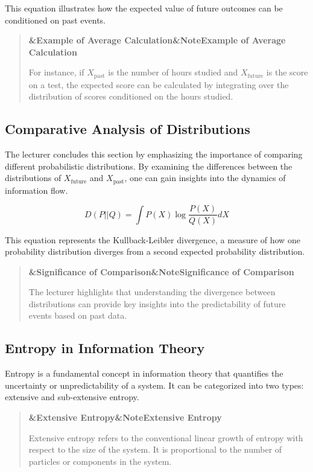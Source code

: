 \documentclass[a4paper]{article}
\newcommand{\boxheading}[1]{%
  \par\smallskip
  \noindent\textbf{\ifx&#1&Note\else#1\fi}\par
  \smallskip
}
\newenvironment{defbox}[1][]{%
  \begin{quote}\color{green!40!black}\boxheading{#1}\normalcolor
}{\end{quote}}
\newenvironment{exbox}[1][]{%
  \begin{quote}\color{brown!70!black}\boxheading{#1}\normalcolor
}{\end{quote}}
\newenvironment{rembox}[1][]{%
  \begin{quote}\color{black!70}\boxheading{#1}\normalcolor
}{\end{quote}}
\begin{document}
This equation illustrates how the expected value of future outcomes can be conditioned on past events.

\begin{exbox}[Example of Average Calculation]
For instance, if \( X_{\text{past}} \) is the number of hours studied and \( X_{\text{future}} \) is the score on a test, the expected score can be calculated by integrating over the distribution of scores conditioned on the hours studied.
\end{exbox}

\subsection{Comparative Analysis of Distributions}
The lecturer concludes this section by emphasizing the importance of comparing different probabilistic distributions. By examining the differences between the distributions of \( X_{\text{future}} \) and \( X_{\text{past}} \), one can gain insights into the dynamics of information flow.

\begin{equation}
D(P || Q) = \int P(X) \log \frac{P(X)}{Q(X)} dX
\end{equation}

This equation represents the Kullback-Leibler divergence, a measure of how one probability distribution diverges from a second expected probability distribution.

\begin{rembox}[Significance of Comparison]
The lecturer highlights that understanding the divergence between distributions can provide key insights into the predictability of future events based on past data.
\end{rembox}

\subsection{Entropy in Information Theory}
Entropy is a fundamental concept in information theory that quantifies the uncertainty or unpredictability of a system. It can be categorized into two types: extensive and sub-extensive entropy.

\begin{defbox}[Extensive Entropy]
Extensive entropy refers to the conventional linear growth of entropy with respect to the size of the system. It is proportional to the number of particles or components in the system.
\end{defbox}
\end{document}
